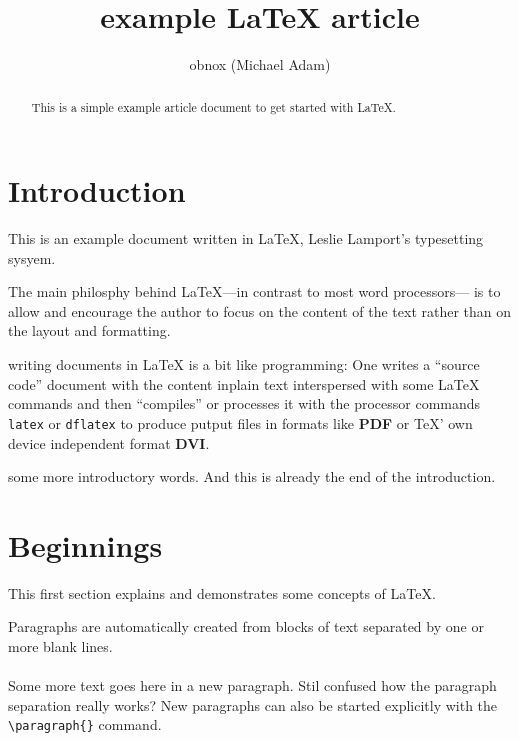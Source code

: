 \documentclass{article}
\title{example {\LaTeX} article}
\author{obnox (Michael Adam)}
\begin{document}
\maketitle
\begin{abstract}

    This is a simple  example article document to get started with  {\LaTeX}.

\end{abstract}

\tableofcontents

\section*{Introduction}

This is an example document written in {\LaTeX}, Leslie Lamport's typesetting
sysyem.

The main philosphy behind {\LaTeX}---in contrast to most word processors--- is to allow and encourage the author to
focus on the content of the text rather than on the layout and formatting.

writing documents in {\LaTeX} is a bit like programming: One writes a ``source code'' document with the content inplain text
interspersed with some {\LaTeX} commands
and then ``compiles'' or processes it with the processor commands \verb|latex| or \verb|dflatex| to produce
putput files in formats like \textbf{PDF} or {TeX}' own device independent format \textbf{DVI}.


some more introductory words.
And this is already the end of the introduction.




\section{Beginnings}
\label{sec:beginnings}

This first section explains and demonstrates some concepts of {\LaTeX}.

Paragraphs are automatically created from blocks of text separated by one or more
blank lines.


\paragraph{} Some more text goes here in a new paragraph.
Stil confused how the paragraph separation really works?
New paragraphs can also be started explicitly with the \verb|\paragraph{}| command.
\end{document}
